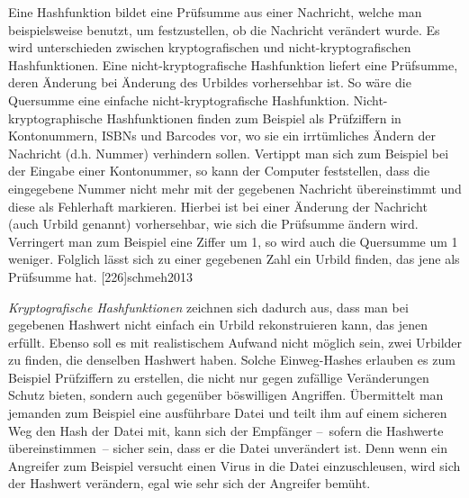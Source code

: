 Eine Hashfunktion bildet eine Prüfsumme aus einer Nachricht, welche man beispielsweise benutzt, um festzustellen, ob die Nachricht verändert wurde.
Es wird unterschieden zwischen kryptografischen und nicht-kryptografischen Hashfunktionen.
Eine nicht-kryptografische Hashfunktion liefert eine Prüfsumme, deren Änderung bei Änderung des Urbildes vorhersehbar ist.
So wäre die Quersumme eine einfache nicht-kryptografische Hashfunktion.
Nicht-kryptographische Hashfunktionen finden zum Beispiel als Prüfziffern in Kontonummern, ISBNs und Barcodes vor, wo sie ein irrtümliches Ändern der Nachricht (d.h. Nummer) verhindern sollen.
Vertippt man sich zum Beispiel bei der Eingabe einer Kontonummer, so kann der Computer feststellen, dass die eingegebene Nummer nicht mehr mit der gegebenen Nachricht übereinstimmt und diese als Fehlerhaft markieren.
Hierbei ist bei einer Änderung der Nachricht (auch Urbild genannt) vorhersehbar, wie sich die Prüfsumme ändern wird.
Verringert man zum Beispiel eine Ziffer um 1, so wird auch die Quersumme um 1 weniger.
Folglich lässt sich zu einer gegebenen Zahl ein Urbild finden, das jene als Prüfsumme hat.
[226]{schmeh2013}

\emph{Kryptografische Hashfunktionen} zeichnen sich dadurch aus, dass man bei gegebenen Hashwert nicht einfach ein Urbild rekonstruieren kann, das jenen erfüllt.
Ebenso soll es mit realistischem Aufwand nicht möglich sein, zwei Urbilder zu finden, die denselben Hashwert haben.
Solche Einweg-Hashes erlauben es zum Beispiel Prüfziffern zu erstellen, die nicht nur gegen zufällige Veränderungen Schutz bieten, sondern auch gegenüber böswilligen Angriffen.
Übermittelt man jemanden zum Beispiel eine ausführbare Datei und teilt ihm auf einem sicheren Weg den Hash der Datei mit, kann sich der Empfänger --~sofern die Hashwerte übereinstimmen~-- sicher sein, dass er die Datei unverändert ist.
Denn wenn ein Angreifer zum Beispiel versucht einen Virus in die Datei einzuschleusen, wird sich der Hashwert verändern, egal wie sehr sich der Angreifer bemüht.
